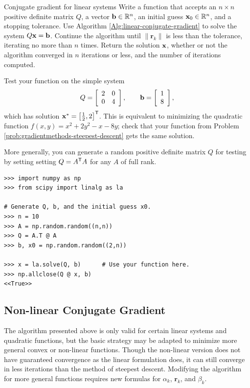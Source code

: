 \begin{problem}{Conjugate gradient for linear systems}{}
Write a function that accepts an $n \times n$ positive definite matrix $Q$, a vector $\mathbf{b}\in\mathbb{R}^n$, an initial guess $\mathbf{x}_0\in\mathbb{R}^n$, and a stopping tolerance.
Use Algorithm \ref{Alg:linear-conjugate-gradient} to solve the system $Q\mathbf{x} = \mathbf{b}$.
Continue the algorithm until $\|\mathbf{r}_k\|$ is less than the tolerance, iterating no more than $n$ times.
Return the solution $\mathbf{x}$, whether or not the algorithm converged in $n$ iterations or less, and the number of iterations computed.

Test your function on the simple system
\[
Q = \left[\begin{array}{cc}2 & 0 \\ 0 & 4\end{array}\right],
\qquad
\mathbf{b} = \left[\begin{array}{c}1 \\ 8\end{array}\right],
\]
which has solution $\mathbf{x}^* = \left[\frac{1}{2}, 2\right]^{\mathsf T}$.
This is equivalent to minimizing the quadratic function $f(x,y) = x^2 + 2y^2 - x - 8y$; check that your function from Problem \ref{prob:gradientmethods-steepest-descent} gets the same solution.

More generally, you can generate a random positive definite matrix $Q$ for testing by setting setting $Q = A^{\mathsf T} A$ for any $A$ of full rank.
\begin{lstlisting}
>>> import numpy as np
>>> from scipy import linalg as la

# Generate Q, b, and the initial guess x0.
>>> n = 10
>>> A = np.random.random((n,n))
>>> Q = A.T @ A
>>> b, x0 = np.random.random((2,n))

>>> x = la.solve(Q, b)      # Use your function here.
>>> np.allclose(Q @ x, b)
<<True>>
\end{lstlisting}
\label{prob:gradientmethods-linear-cg}
\end{problem}

\subsection*{Non-linear Conjugate Gradient}
The algorithm presented above is only valid for certain linear systems and quadratic functions, but the basic strategy may be adapted to minimize more general convex or non-linear functions.
Though the non-linear version does not have guaranteed convergence as the linear formulation does, it can still converge in less iterations than the method of steepest descent.
Modifying the algorithm for more general functions requires new formulas for $\alpha_k$, $\mathbf{r}_k$, and $\beta_k$.

